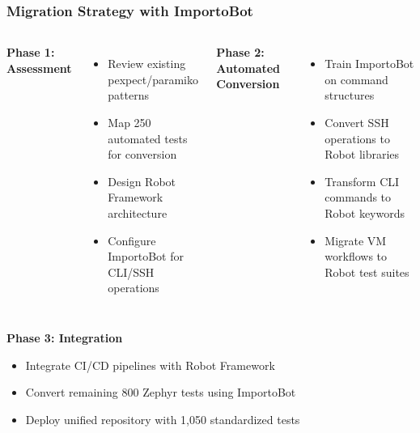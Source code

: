 \begin{frame}
\frametitle{Migration Strategy with ImportoBot}
\begin{columns}
\textbf{Phase 1: Assessment}
\begin{itemize}
    \item Review existing pexpect/paramiko patterns
    \item Map 250 automated tests for conversion
    \item Design Robot Framework architecture
    \item Configure ImportoBot for CLI/SSH operations
\end{itemize}

\textbf{Phase 2: Automated Conversion}
\begin{itemize}
    \item Train ImportoBot on command structures
    \item Convert SSH operations to Robot libraries
    \item Transform CLI commands to Robot keywords
    \item Migrate VM workflows to Robot test suites
\end{itemize}
\end{columns}

\vspace{0.3cm}
\textbf{Phase 3: Integration}
\begin{itemize}
    \item Integrate CI/CD pipelines with Robot Framework
    \item Convert remaining 800 Zephyr tests using ImportoBot
    \item Deploy unified repository with 1,050 standardized tests
\end{itemize}
\end{frame}

